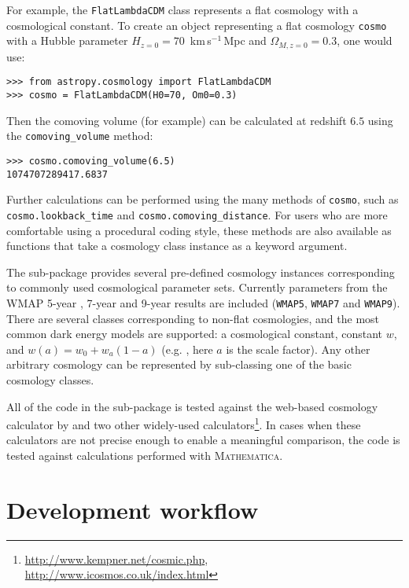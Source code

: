 \documentclass[traditabstract]{aa}
\begin{document}
For example, the \texttt{FlatLambdaCDM} class represents a flat
cosmology with a cosmological constant. To create an object
representing a flat cosmology \texttt{cosmo} with a Hubble parameter
$H_{z=0} = 70$~km\,s$^{-1}$\,Mpc and $\Omega_{M,z=0} = 0.3$, one would
use:

\begin{verbatim}
>>> from astropy.cosmology import FlatLambdaCDM
>>> cosmo = FlatLambdaCDM(H0=70, Om0=0.3)
\end{verbatim}

\noindent Then the comoving volume (for example) can be calculated at
redshift $6.5$ using the \texttt{comoving\_volume} method:

\begin{verbatim}
>>> cosmo.comoving_volume(6.5)
1074707289417.6837
\end{verbatim}

\noindent Further calculations can be performed using the many methods
of \texttt{cosmo}, such as \texttt{cosmo.lookback\_time} and
\texttt{cosmo.comoving\_distance}.  For users who are more comfortable
using a procedural coding style, these methods are also available as
functions that take a cosmology class instance as a keyword argument.

The sub-package provides several pre-defined cosmology instances
corresponding to commonly used cosmological parameter sets. Currently
parameters from the WMAP 5-year \citep{Komatsu09}, 7-year
\citep{Komatsu11} and 9-year results \citep{Hinshaw13} are included
(\texttt{WMAP5}, \texttt{WMAP7} and \texttt{WMAP9}). There are several
classes corresponding to non-flat cosmologies, and the most common
dark energy models are supported: a cosmological constant, constant
$w$, and $w(a) = w_0 + w_a (1-a)$ (e.g. \citealt{Linder03}, here $a$
is the scale factor). Any other arbitrary cosmology can be represented
by sub-classing one of the basic cosmology classes.

All of the code in the sub-package is tested against the web-based
cosmology calculator by \citet{Wright06} and two other widely-used
calculators\footnote{\url{http://www.kempner.net/cosmic.php},\\ \url{http://www.icosmos.co.uk/index.html}}.
In cases when these calculators are not precise enough to enable a
meaningful comparison, the code is tested against calculations
performed with \textsc{Mathematica}.

\section{Development workflow}
\end{document}
